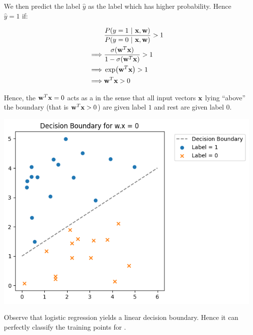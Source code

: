 We then predict the label $\hat{y}$ as the label which has higher probability. Hence $\hat{y} = 1$ if:

\begin{align*}
           & \frac{P(y = 1 \ | \  \textbf{x}, \textbf{w})}{P(y = 0 \ | \  \textbf{x}, \textbf{w})} > 1 \\
  \implies & \frac{\sigma(\textbf{w}^T\textbf{x})}{1 - \sigma(\textbf{w}^T\textbf{x})} > 1           \\
  \implies & \exp(\textbf{w}^T\textbf{x}) > 1                                                \\
  \implies & \textbf{w}^T\textbf{x} > 0
\end{align*}

Hence, the  $\textbf{w}^T \textbf{x} = 0$ acts as a  in the sense that all input vectors $\textbf{x}$ lying ``above'' the boundary (that is $\textbf{w}^T \textbf{x} > 0$) are given label $1$ and rest are given label $0$.

\begin{center}
  \includegraphics[scale=0.4]{images/05_02.png}
\end{center}

Observe that logistic regression yields a linear decision boundary. Hence it can perfectly classify the training points for . \\

 \\

